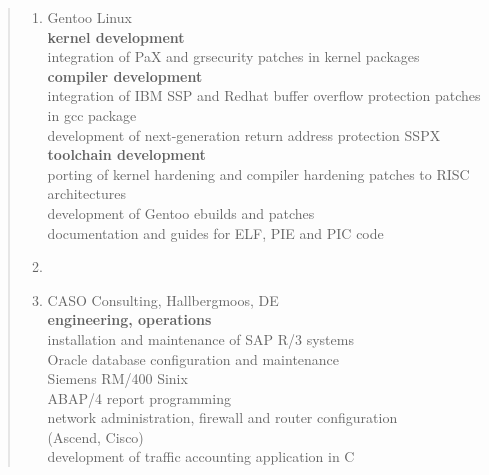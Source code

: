 \documentclass[a4paper]{report}
\begin{document}
\begin{quote}
\begin{enumerate}
\item[1999 - 2003]  Gentoo Linux\\
                    \textbf{kernel development}\\
                    integration of PaX and grsecurity patches in kernel packages\\
                    \textbf{compiler development}\\
                    integration of IBM SSP and Redhat buffer overflow protection patches in gcc package\\
                    development of next-generation return address protection SSPX\\
                    \textbf{toolchain development}\\
                    porting of kernel hardening and compiler hardening patches to RISC architectures\\
                    development of Gentoo ebuilds and patches\\
                    documentation and guides for ELF, PIE and PIC code

\item[ ]

\item[1999]         CASO Consulting, Hallbergmoos, DE\\
                    \textbf{engineering, operations}\\
                    installation and maintenance of SAP R/3 systems\\
                    Oracle database configuration and maintenance\\
                    Siemens RM/400 Sinix\\
                    ABAP/4 report programming\\
                    network administration, firewall and router configuration\\
                    (Ascend, Cisco)\\
                    development of traffic accounting application in C

\end{enumerate}
\end{quote}
\end{document}
